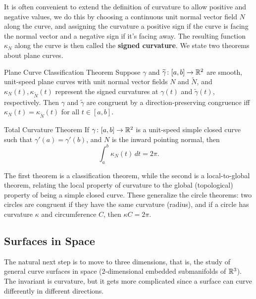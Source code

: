 It is often convenient to extend the definition of curvature to allow positive and negative values, we do this by choosing a continuous unit normal vector field $N$ along the curve, and assigning the curvature a positive sign if the curve is facing the normal vector and a negative sign if it's facing away. The resulting function $\kappa_N$ along the curve is then called the \textbf{signed curvature}. We state two theorems about plane curves.
\begin{namedthm}{Plane Curve Classification Theorem}
    Suppose $\gamma$ and $\widetilde \gamma \colon [a,b] \to \mathbb{R}^2$ are smooth, unit-speed plane curves with unit normal vector fields $N$ and $\widetilde N$, and $\kappa_N(t), \kappa_{\widetilde N}(t)$ represent the signed curvatures at $\gamma(t)$ and $\widetilde \gamma(t)$, respectively. Then $\gamma$ and $\widetilde \gamma$ are congruent by a direction-preserving congruence iff $\kappa_N(t)=\kappa _{\widetilde N}(t)$ for all $t \in [a,b]$.
\end{namedthm}
\begin{namedthm}{Total Curvature Theorem}
    If $\gamma \colon [a,b] \to \mathbb{R}^2$ is a unit-speed simple closed curve such that $\gamma'(a)=\gamma'(b)$, and $N$ is the inward pointing normal, then \[
        \int_{a}^{b} \kappa_N(t) \, dt=2\pi .
    \]  
\end{namedthm}
The first theorem is a classification theorem, while the second is a local-to-global theorem, relating the local property of curvature to the global (topological) property of being a simple closed curve. These generalize the circle theorems: two circles are congruent if they have the same curvature (radius), and if a circle has curvature $\kappa$ and circumference $C$, then $\kappa C=2\pi $.

\subsection{Surfaces in Space}
The natural next step is to move to three dimensions, that is, the study of general curve surfaces in space ($2$-dimensional embedded submanifolds of $\mathbb{R}^3$). The invariant is curvature, but it gets more complicated since a surface can curve differently in different directions. 

